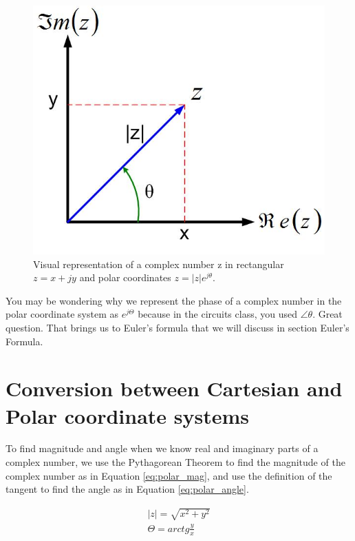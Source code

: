 \documentclass{ximera}
\begin{document}
\begin{figure}[htbp]
\begin{center}
\includegraphics[scale=0.3]{../jpg/Complex_Numbersz12.jpg}
\end{center}
\caption{Visual representation of a complex number z in rectangular $z=x+jy$ and polar coordinates $z=|z|e^{j \theta}$.}
\label{cartpol}
\end{figure}




You may be wondering why we represent the phase of a complex number in the polar coordinate system as  $e^{j \Theta}$ because in the circuits class, you used $ \angle \theta $. Great question. That brings us to Euler's formula that we will discuss in section Euler's Formula.

\section{Conversion between Cartesian and Polar coordinate systems}
  
  To find magnitude and angle when we know real and imaginary parts of a complex number, we use the Pythagorean Theorem to find the magnitude of the complex number as in Equation \ref{eq:polar_mag}, and use the definition of the tangent to find the angle as in Equation \ref{eq:polar_angle}.

\begin{eqnarray}
|z|=\sqrt{x^2+y^2} \label{eq:polar_mag}\\
\Theta = arctg \frac{y}{x} \label{eq:polar_angle}
\end{eqnarray}
 
\end{document}
